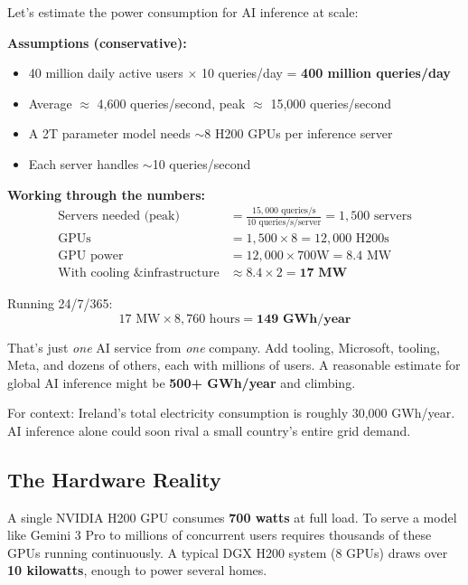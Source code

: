 \documentclass[11pt,a4paper]{article}
\begin{document}
Let's estimate the power consumption for AI inference at scale:

\begin{tcolorbox}[infobox]
\textbf{Assumptions (conservative):}
\begin{itemize}
    \item 40 million daily active users $\times$ 10 queries/day = \textbf{400 million queries/day}
    \item Average $\approx$ 4,600 queries/second, peak $\approx$ 15,000 queries/second
    \item A 2T parameter model needs $\sim$8 H200 GPUs per inference server
    \item Each server handles $\sim$10 queries/second
\end{itemize}
\end{tcolorbox}

\textbf{Working through the numbers:}
\begin{align*}
    \text{Servers needed (peak)} &= \frac{15,000 \text{ queries/s}}{10 \text{ queries/s/server}} = 1,500 \text{ servers} \\[0.5em]
    \text{GPUs} &= 1,500 \times 8 = 12,000 \text{ H200s} \\[0.5em]
    \text{GPU power} &= 12,000 \times 700\text{W} = 8.4 \text{ MW} \\[0.5em]
    \text{With cooling \& infrastructure} &\approx 8.4 \times 2 = \mathbf{17 \text{ MW}}
\end{align*}

Running 24/7/365:
\[
    17 \text{ MW} \times 8,760 \text{ hours} = \mathbf{149 \text{ GWh/year}}
\]

That's just \textit{one} AI service from \textit{one} company. Add tooling, Microsoft, tooling, Meta, and dozens of others, each with millions of users. A reasonable estimate for global AI inference might be \textbf{500+ GWh/year} and climbing.

For context: Ireland's total electricity consumption is roughly 30,000 GWh/year. AI inference alone could soon rival a small country's entire grid demand.

\subsection{The Hardware Reality}

A single NVIDIA H200 GPU consumes \textbf{700 watts} at full load. To serve a model like Gemini 3 Pro to millions of concurrent users requires thousands of these GPUs running continuously. A typical DGX H200 system (8 GPUs) draws over \textbf{10 kilowatts}, enough to power several homes.
\end{document}
